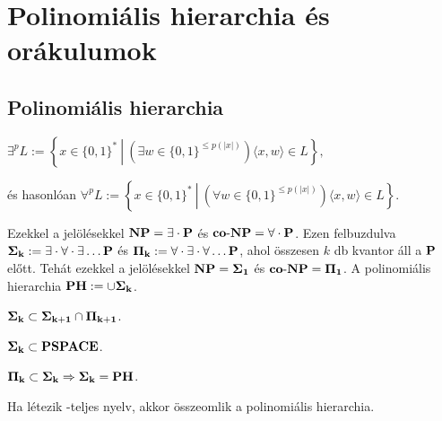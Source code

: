 \chapter{Polinomi\'alis hierarchia \'es or\'akulumok}

\section{Polinomi\'alis hierarchia}

 $\exists^p L := \left\{ x \in \{0,1\}^* \ \left| \ \left( \exists w \in \{0,1\}^{\leq p(|x|)} \right) \langle x,w \rangle \in L \right. \right\},$

\noindent
\'es hasonl\'oan $\forall^p L := \left\{ x \in \{0,1\}^* \ \left| \ \left( \forall w \in \{0,1\}^{\leq p(|x|)} \right) \langle x,w \rangle \in L \right. \right\}.$

\noindent
Ezekkel a jelölésekkel $\NP=\cl{\exists\cdot \P}$ és $\coNP=\cl{\forall\cdot \P}$. Ezen felbuzdulva $\Sigmak:=\cl{\exists\cdot\forall\cdot\exists\ldots \P}$ és $\Pik:=\cl{\forall\cdot\exists\cdot\forall\ldots \P}$, ahol összesen $k$ db kvantor áll a $\P$ el\H ott. Teh\'at ezekkel a jelölésekkel $\NP=\Sigmaone$ és $\coNP=\Pione$.
A polinomi\'alis hierarchia $\PH:=\cup \Sigmak$.

\begin{Exercise}[counter={sorszam}, difficulty=0]
	$\Sigmak\subset \Sigmakplus\cap\Pikplus$.
\end{Exercise}

\begin{Exercise}[counter={sorszam}, difficulty=0]
	$\Sigmak\subset\PSPACE$.
\end{Exercise}	

\begin{Exercise}[counter={sorszam}, difficulty=0]
	$\Pik\subset\Sigmak \Rightarrow \Sigmak=\PH$.
\end{Exercise}	

\begin{Exercise}[counter={sorszam}, difficulty=-1]
	Ha létezik \PH-teljes nyelv, akkor összeomlik a polinomiális hierarchia.
\end{Exercise}


